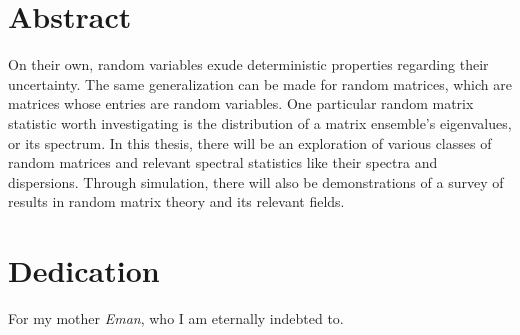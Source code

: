 \documentclass[12pt,twoside]{reedthesis}
\begin{document}
    \begin{center}

    \Ddisttable \newline

    \hfill \vspace{2em}

    \spectrumschemetable \newline

    \hfill \vspace{2em}

    \dispersiontable \newline

    \hfill \vspace{2em}

    \pairingschemetable \newline

    \end{center}


    \chapter*{Abstract}
	On their own, random variables exude deterministic properties regarding their uncertainty. The same generalization can be made for random matrices, which are matrices whose entries are random variables. One particular random matrix statistic worth investigating is the distribution of a matrix ensemble's eigenvalues, or its spectrum. In this thesis, there will be an exploration of various classes of random matrices and relevant spectral statistics like their spectra and dispersions. Through simulation, there will also be demonstrations of a survey of results in random matrix theory and its relevant fields.

	\chapter*{Dedication}
  \vspace{15em}
  \begin{center}
    For my mother \textit{Eman}, who I am eternally indebted to.
  \end{center}

  \mainmatter %
  \pagestyle{fancyplain} %


\end{document}
